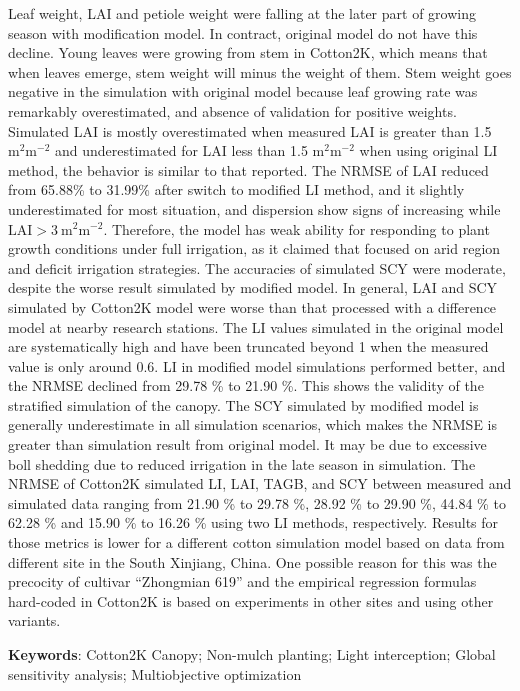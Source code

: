 Leaf weight, LAI and petiole weight were falling at the later part of growing season with modification model.
In contract, original model do not have this decline.
Young leaves were growing from stem in Cotton2K, which means that when leaves emerge, stem weight will minus the weight of them.
Stem weight goes negative in the simulation with original model because leaf growing rate was remarkably overestimated,
and absence of validation for positive weights.
Simulated LAI is mostly overestimated when measured LAI is greater than 1.5 $\mathrm{m^2 m^{-2}}$ and underestimated
for LAI less than 1.5 $\mathrm{m^2 m^{-2}}$ when using original LI method, the behavior is similar to that
 reported.
The NRMSE of LAI reduced from 65.88\% to 31.99\% after switch to modified LI method, and it slightly underestimated for
most situation, and dispersion show signs of increasing while $\mathrm{LAI > 3\ m^2 m^{-2}}$.
Therefore, the model has weak ability for responding to plant growth conditions under full irrigation, as it claimed
that focused on arid region and deficit irrigation strategies.
The accuracies of simulated SCY were moderate, despite the worse result simulated by modified model.
In general, LAI and SCY simulated by Cotton2K model were worse than that processed with a difference model at nearby
research stations.
The LI values simulated in the original model are systematically high and have been truncated beyond 1 when the measured value is only around 0.6.
LI in modified model simulations performed better, and the NRMSE declined from 29.78 \% to 21.90 \%.
This shows the validity of the stratified simulation of the canopy.
The SCY simulated by modified model is generally underestimate in all simulation scenarios, which makes the NRMSE is
greater than simulation result from original model.
It may be due to excessive boll shedding due to reduced irrigation in the late season in simulation.
The NRMSE of Cotton2K simulated LI, LAI, TAGB, and SCY between measured and simulated data ranging from
21.90 \% to 29.78 \%, 28.92 \% to 29.90 \%, 44.84 \% to 62.28 \% and 15.90 \% to 16.26 \% using two LI methods, respectively.
Results for those metrics is lower for a different cotton simulation model based on data from different site in the South Xinjiang, China.
One possible reason for this was the precocity of cultivar ``Zhongmian 619'' and the empirical regression formulas hard-coded in Cotton2K
is based on experiments in other sites and using other variants.

\textbf{Keywords}: Cotton2K Canopy; Non-mulch planting; Light interception; Global sensitivity analysis; Multiobjective optimization

